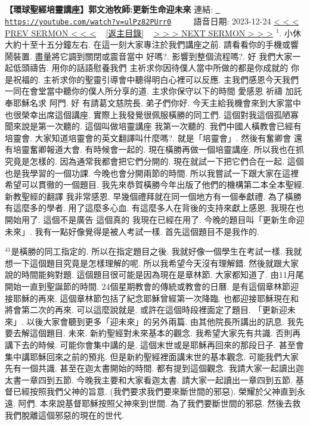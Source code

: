 \documentclass{book}
\begin{document}
\section{}
\label{sec:ulPz82PUrr0}
\textbf{【環球聖經培靈講座】郭文池牧師:更新生命迎未來}
\newline
\newline
連結: \href{https://youtube.com/watch?v=ulPz82PUrr0}{\texttt{ https://youtube.com/watch?v=ulPz82PUrr0}} ~~~~ 語音日期: 2023-12-24 
\newline
\newline
\hyperref[sec:CDU45BWPZ6Q]{\small{< < < PREV SERMON < < <}}
~
\hyperref[sec:index]{\small{[返主目錄]}}
~
\hyperref[sec:8kvOuQqa6z0]{\small{> > > NEXT SERMON > > >}}
\newline
\newline
$^{1}$.
小休大約十至十五分鐘左右.
在這一刻大家專注於我們講座之前.
請看看你的手機或響鬧裝置.
盡量將它調到關閉或震音當中 好嗎?.
影響到整個流程嗎?.
好 我們大家一起低頭禱告.
用你的話語慰養我們 主祈求你因待僕人當中所做的都是你成就的 你是祝福的.
主祈求你的聖靈引導會中聽得明白心裡可以反應.
主我們感恩今天我們一同在會堂當中聽你的僕人所分享的道.
主求你保守以下的時間 愛感恩 祈禱 加託 奉耶穌名求 阿門.
好 有請葛文慈院長.
弟子們你好.
今天主給我機會來到大家當中 也很榮幸出席這個講座.
實際上我發覺很佩服橫勝的同工們.
這個對我這個孤陋寡聞來說是第一次聽的.
這個叫做培靈講座 我第一次聽的.
我們中國人橫教會已經有培靈會.
大家知道培靈會的英文翻譯叫什麼嗎?.
就是「培靈會」.
然後有奮卿會 還有培靈奮卿報道大會.
有時候會一起的.
現在橫勝再做一個培靈講座.
所以我也在抓究竟是怎樣的.
因為通常我都會把它們分開的.
現在就試一下把它們合在一起.
這個也是我學習的一個功課.
今晚也會分開兩節的時間.
所以我嘗試一下跟大家在這裡希望可以貫徹的一個題目.
我先來恭賀橫勝今年出版了他們的機構第二本全本聖經.
新教聖經的翻譯 我非常感恩.
早幾個禮拜就在同一個地方有一個奉獻禮.
為了橫勝有這麼多的學者.
用了這麼多心血.
有這麼多人在背後的支持來獻上感恩.
我現在也開始用了.
這個不是廣告 這個真的 我現在已經在用了.
今晚的題目叫「更新生命迎未來」.
我有一點好像覺得是被人考試一樣.
首先這個題目不是我作的.

$^{41}$是橫勝的同工指定的.
所以在指定題目之後.
我就好像一個學生在考試一樣.
我就想一下這個題目究竟是怎樣理解的呢.
所以我希望今天沒有理解錯.
然後就跟大家說的時間能夠對題.
這個題目很可能是因為現在是章林節.
大家都知道了.
由11月尾開始一直到聖誕節的時間.
24個星期教會的傳統或教會的日曆.
是有這個章林節迎接耶穌的再來.
這個章林節包括了紀念耶穌曾經第一次降臨.
也都迎接耶穌現在和將會第二次的再來.
可以這麼說就是.
或許在這個時段裡面定了題目.
「更新迎未來」.
以後大家會聽到更多「迎未來」的另外兩篇.
由其他院長所講出的訊息.
我先要去解這個題目.
未來.
新約聖經對未來基本的觀念.
我希望大家先有共識.
否則再講下去的時候.
可能你會集中講的是.
這個末世或是耶穌再回來的那段日子.
甚至會集中講耶穌回來之前的預兆.
但是新約聖經裡面講末世的基本觀念.
可能我們大家先有一個共識.
甚至在迦太書開始的時間.
都有提到這個觀念.
我請大家一起讀出迦太書一章四到五節.
今晚我主要和大家看迦太書.
請大家一起讀出一章四到五節.
基督已經按照我們父神的旨意.
(我們要求我們要來斷世間的邪惡).
榮耀於父神直到永遠.
阿們.
本來說基督耶穌按照父神來到世間.
為了我們要斷世間的邪惡.
然後去救我們脫離這個邪惡的現在的世代.
\end{document}
